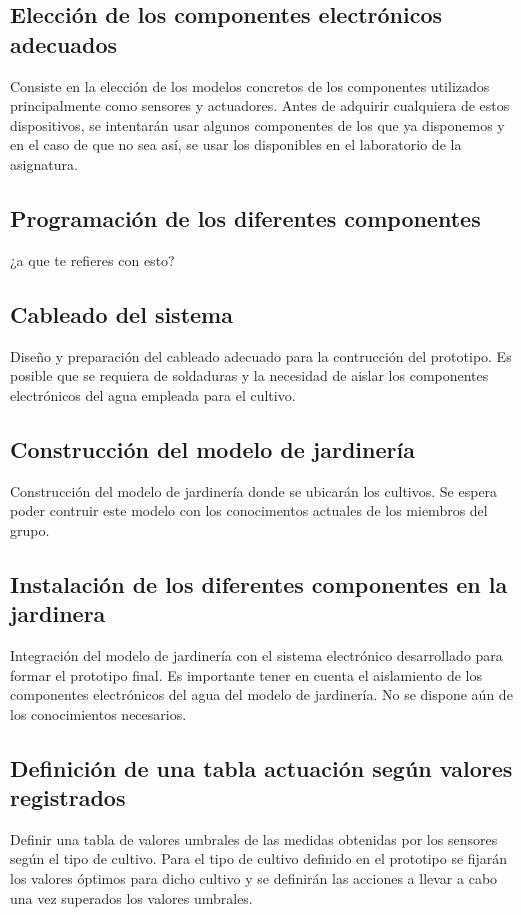 \documentclass[12pt,a4paper,titlepage,oneside]{report}
\begin{document}
	\subsection*{Elección de los componentes electrónicos adecuados}	
	Consiste en la elección de los modelos concretos de los componentes utilizados principalmente como sensores y actuadores. Antes de adquirir cualquiera de estos dispositivos, se intentarán usar algunos componentes de los que ya disponemos y en el caso de que no sea así, se usar los disponibles en el laboratorio de la asignatura. 

	\subsection*{Programación de los diferentes componentes}
\color{red} ¿a que te refieres con esto? \color{black}
	
	\subsection*{Cableado del sistema}
	Diseño y preparación del cableado adecuado para la contrucción del prototipo. Es posible que se requiera de soldaduras y la necesidad de aislar los componentes electrónicos del agua empleada para el cultivo.

	\subsection*{Construcción del modelo de jardinería}
	Construcción del modelo de jardinería donde se ubicarán los cultivos. Se espera poder contruir este modelo con los conocimentos actuales de los miembros del grupo.

	\subsection*{Instalación de los diferentes componentes en la jardinera}
	Integración del modelo de jardinería con el sistema electrónico desarrollado para formar el prototipo final. Es importante tener en cuenta el aislamiento de los componentes electrónicos del agua del modelo de jardinería. No se dispone aún de los conocimientos necesarios.

\subsection*{Definición de una tabla actuación según valores registrados}
	Definir una tabla de valores umbrales de las medidas obtenidas por los sensores según el tipo de cultivo. Para el tipo de cultivo definido en el prototipo se fijarán los valores óptimos para dicho cultivo y se definirán las acciones a llevar a cabo una vez superados los valores umbrales.
	
\end{document}
